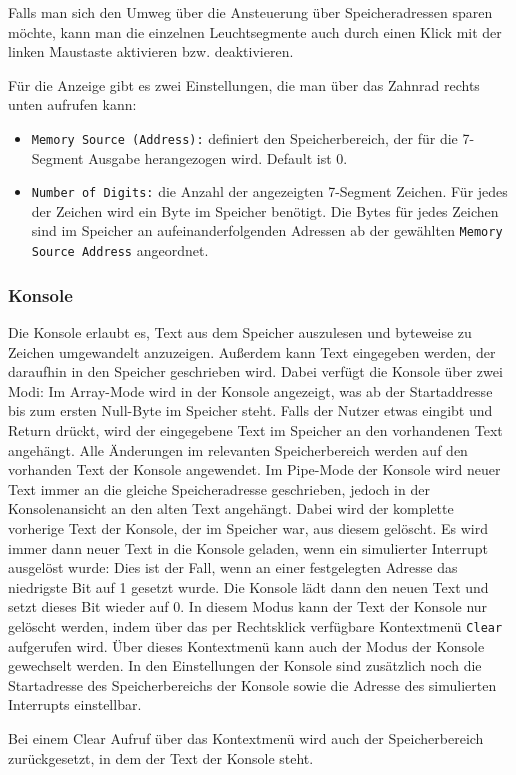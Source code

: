 Falls man sich den Umweg über die Ansteuerung über Speicheradressen sparen möchte,
kann man die einzelnen Leuchtsegmente auch durch einen Klick mit der linken Maustaste aktivieren bzw. deaktivieren.

Für die Anzeige gibt es zwei Einstellungen, die man über das Zahnrad rechts unten aufrufen kann:\\
\begin{itemize}
\item \texttt{Memory Source (Address):} definiert den Speicherbereich, der für die 7-Segment Ausgabe herangezogen wird. Default ist 0.
\item \texttt{Number of Digits:} die Anzahl der angezeigten 7-Segment Zeichen. Für jedes der Zeichen wird ein Byte im Speicher benötigt.
					Die Bytes für jedes Zeichen sind im Speicher an aufeinanderfolgenden Adressen ab der gewählten  \texttt{Memory Source Address} angeordnet.
\end{itemize}



\subsubsection{Konsole}
Die Konsole erlaubt es, Text aus dem Speicher auszulesen und byteweise zu
Zeichen umgewandelt anzuzeigen. Außerdem kann Text eingegeben werden, der
daraufhin in den Speicher geschrieben wird. Dabei verfügt die Konsole über zwei
Modi: Im Array-Mode wird in der Konsole angezeigt, was ab der Startaddresse bis
zum ersten Null-Byte im Speicher steht. Falls der Nutzer etwas eingibt und
Return drückt, wird der eingegebene Text im Speicher an den vorhandenen Text
angehängt. Alle Änderungen im relevanten Speicherbereich werden auf den
vorhanden Text der Konsole angewendet. Im Pipe-Mode der Konsole wird neuer Text
immer an die gleiche Speicheradresse geschrieben, jedoch in der Konsolenansicht
an den alten Text angehängt. Dabei wird der komplette vorherige Text der
Konsole, der im Speicher war, aus diesem gelöscht. Es wird immer dann neuer Text
in die Konsole geladen, wenn ein simulierter Interrupt ausgelöst wurde: Dies ist
der Fall, wenn an einer festgelegten Adresse das niedrigste Bit auf 1 gesetzt
wurde. Die Konsole lädt dann den neuen Text und setzt dieses Bit wieder auf 0.
In diesem Modus kann der Text der Konsole nur gelöscht werden, indem über das
per Rechtsklick verfügbare Kontextmenü \texttt{Clear} aufgerufen wird. Über
dieses Kontextmenü kann auch der Modus der Konsole gewechselt werden. In den
Einstellungen der Konsole sind zusätzlich noch die Startadresse des
Speicherbereichs der Konsole sowie die Adresse des simulierten Interrupts
einstellbar.
\begin{warningblock}
Bei einem Clear Aufruf über das Kontextmenü wird auch der Speicherbereich
zurückgesetzt, in dem der Text der Konsole steht.
\end{warningblock}

